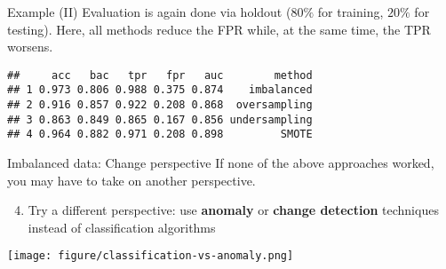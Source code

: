 \documentclass[11pt,compress,t,notes=noshow, aspectratio=169, xcolor=table]{beamer}
\begin{document}
\begin{frame}[fragile]{Example (II)}
\label{example-ii}
Evaluation is again done via holdout (\(80\%\) for training, \(20\%\)
for testing). Here, all methods reduce the FPR while, at the same time,
the TPR worsens.

\scriptsize

\begin{verbatim}
##     acc   bac   tpr   fpr   auc        method
## 1 0.973 0.806 0.988 0.375 0.874    imbalanced
## 2 0.916 0.857 0.922 0.208 0.868  oversampling
## 3 0.863 0.849 0.865 0.167 0.856 undersampling
## 4 0.964 0.882 0.971 0.208 0.898         SMOTE
\end{verbatim}

\normalsize
\end{frame}

\begin{frame}{Imbalanced data: Change perspective}
\label{imbalanced-data-change-perspective}
If none of the above approaches worked, you may have to take on another
perspective.

\begin{enumerate}
\setcounter{enumi}{3}
\tightlist
\item
  Try a different perspective: use \textbf{anomaly} or \textbf{change
  detection} techniques instead of classification algorithms
\end{enumerate}

\begin{center}
\texttt{[image: figure/classification-vs-anomaly.png]}
\end{center}
\end{frame}


\endlecture
\end{document}
